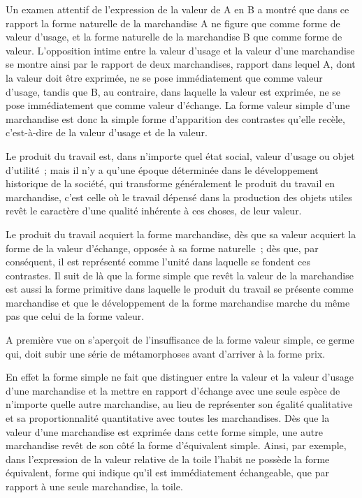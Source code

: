 \documentclass[french,twoside]{book} %
\begin{document}
Un examen attentif de l’expression de la valeur de A en B a montré que dans ce rapport la forme naturelle de la marchandise A ne figure que comme forme de valeur d’usage, et la forme naturelle de la marchandise B que comme forme de valeur. L’opposition intime entre la valeur d’usage et la valeur d’une marchandise se montre ainsi par le rapport de deux marchandises, rapport dans lequel A, dont la valeur doit être exprimée, ne se pose immédiatement que comme valeur d’usage, tandis que B, au contraire, dans laquelle la valeur est exprimée, ne se pose immédiatement que comme valeur d’échange. La forme valeur simple d’une marchandise est donc la simple forme d’apparition des contrastes qu’elle recèle, c’est-à-dire de la valeur d’usage et de la valeur.\par
Le produit du travail est, dans n’importe quel état social, valeur d’usage ou objet d’utilité ; mais il n’y a qu’une époque déterminée dans le développement historique de la société, qui transforme généralement le produit du travail en marchandise, c’est celle où le travail dépensé dans la production des objets utiles revêt le caractère d’une qualité inhérente à ces choses, de leur valeur.\par
Le produit du travail acquiert la forme marchandise, dès que sa valeur acquiert la forme de la valeur d’échange, opposée à sa forme naturelle ; dès que, par conséquent, il est représenté comme l’unité dans laquelle se fondent ces contrastes. Il suit de là que la forme simple que revêt la valeur de la marchandise est aussi la forme primitive dans laquelle le produit du travail se présente comme marchandise et que le développement de la forme marchandise marche du même pas que celui de la forme valeur.\par
A première vue on s’aperçoit de l’insuffisance de la forme valeur simple, ce germe qui, doit subir une série de métamorphoses avant d’arriver à la forme prix.\par
En effet la forme simple ne fait que distinguer entre la valeur et la valeur d’usage d’une marchandise et la mettre en rapport d’échange avec une seule espèce de n’importe quelle autre marchandise, au lieu de représenter son égalité qualitative et sa proportionnalité quantitative avec toutes les marchandises. Dès que la valeur d’une marchandise est exprimée dans cette forme simple, une autre marchandise revêt de son côté la forme d’équivalent simple. Ainsi, par exemple, dans l’expression de la valeur relative de la toile l’habit ne possède la forme équivalent, forme qui indique qu’il est immédiatement échangeable, que par rapport à une seule marchandise, la toile.\par
\end{document}
